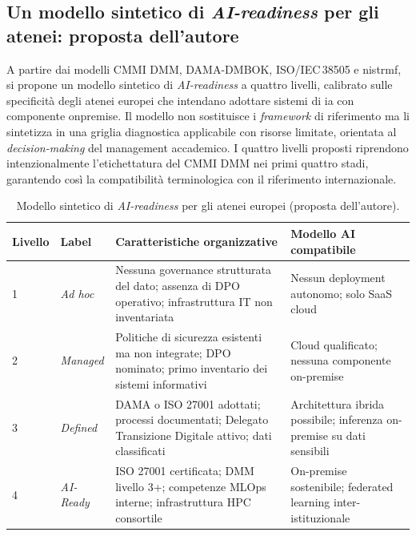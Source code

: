 \subsection{Un modello sintetico di \textit{AI-readiness} per gli atenei: proposta
dell'autore}

A partire dai modelli CMMI DMM, DAMA-DMBOK, ISO/IEC\,38505 e \gls{nistrmf}, si propone un
modello sintetico di \textit{AI-readiness} a quattro livelli, calibrato sulle
specificità degli atenei europei che intendano adottare sistemi di \gls{ia} con componente
\gls{onpremise}. Il modello non sostituisce i \textit{framework} di riferimento ma li
sintetizza in una griglia diagnostica applicabile con risorse limitate, orientata al
\textit{decision-making} del management accademico. I quattro livelli proposti riprendono
intenzionalmente l'etichettatura del CMMI DMM nei primi quattro stadi, garantendo
così la compatibilità terminologica con il riferimento internazionale.

\begin{table}[H]
\centering
\caption{Modello sintetico di \textit{AI-readiness} per gli atenei europei (proposta
dell'autore).}
\label{tab:ai-readiness}
\begin{tabularx}{\textwidth}{l l X X}
\toprule
\textbf{Livello} & \textbf{Label} & \textbf{Caratteristiche organizzative} &
\textbf{Modello AI compatibile} \\
\midrule
1 & \textit{Ad hoc} & Nessuna governance strutturata del dato; assenza di DPO operativo;
infrastruttura IT non inventariata & Nessun deployment autonomo; solo SaaS cloud \\
2 & \textit{Managed} & Politiche di sicurezza esistenti ma non integrate; DPO nominato;
primo inventario dei sistemi informativi & Cloud qualificato; nessuna componente
on-premise \\
3 & \textit{Defined} & DAMA o ISO 27001 adottati; processi documentati; Delegato
Transizione Digitale attivo; dati classificati & Architettura ibrida possibile; inferenza
on-premise su dati sensibili \\
4 & \textit{AI-Ready} & ISO 27001 certificata; DMM livello 3+; competenze MLOps interne;
infrastruttura HPC consortile & On-premise sostenibile; federated learning
inter-istituzionale \\
\bottomrule
\end{tabularx}
\end{table}

